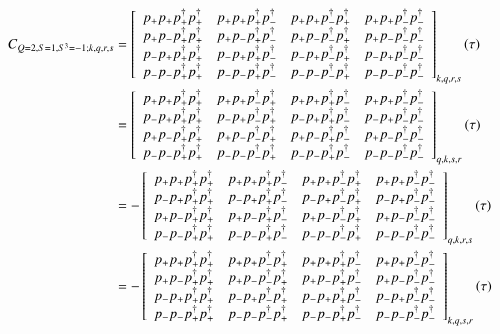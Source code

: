 \begin{equation*}
  \begin{aligned} 
    C_{Q=2,S=1,S^3=-1;k,q,r,s} &=
    \left[
    \begin{array}{cccc}
      \cor{+}{+}{+}{+} & \cor{+}{+}{+}{-} & \cor{+}{+}{-}{+} & \cor{+}{+}{-}{-} \\
      \cor{+}{-}{+}{+} & \cor{+}{-}{+}{-} & \cor{+}{-}{-}{+} & \cor{+}{-}{-}{-} \\
      \cor{-}{+}{+}{+} & \cor{-}{+}{+}{-} & \cor{-}{+}{-}{+} & \cor{-}{+}{-}{-} \\
      \cor{-}{-}{+}{+} & \cor{-}{-}{+}{-} & \cor{-}{-}{-}{+} & \cor{-}{-}{-}{-} \\
    \end{array}
    \right]_{k,q,r,s} (\tau) \\
    &=\left[ 
    \begin{array}{cccc}
      \cor{+}{+}{+}{+} & \cor{+}{+}{-}{+} & \cor{+}{+}{+}{-} & \cor{+}{+}{-}{-} \\
      \cor{-}{+}{+}{+} & \cor{-}{+}{-}{+} & \cor{-}{+}{+}{-} & \cor{-}{+}{-}{-} \\
      \cor{+}{-}{+}{+} & \cor{+}{-}{-}{+} & \cor{+}{-}{+}{-} & \cor{+}{-}{-}{-} \\
      \cor{-}{-}{+}{+} & \cor{-}{-}{-}{+} & \cor{-}{-}{+}{-} & \cor{-}{-}{-}{-} \\
    \end{array}  
    \right]_{q,k,s,r} (\tau) \\
    &= - \left[
    \begin{array}{cccc}
      \cor{+}{+}{+}{+} & \cor{+}{+}{+}{-} & \cor{+}{+}{-}{+} & \cor{+}{+}{-}{-} \\
      \cor{-}{+}{+}{+} & \cor{-}{+}{+}{-} & \cor{-}{+}{-}{+} & \cor{-}{+}{-}{-} \\
      \cor{+}{-}{+}{+} & \cor{+}{-}{+}{-} & \cor{+}{-}{-}{+} & \cor{+}{-}{-}{-} \\
      \cor{-}{-}{+}{+} & \cor{-}{-}{+}{-} & \cor{-}{-}{-}{+} & \cor{-}{-}{-}{-} \\
    \end{array}
    \right]_{q,k,r,s} (\tau) \\
    &= - \left[
    \begin{array}{cccc}
      \cor{+}{+}{+}{+} & \cor{+}{+}{-}{+} & \cor{+}{+}{+}{-} & \cor{+}{+}{-}{-} \\
      \cor{+}{-}{+}{+} & \cor{+}{-}{-}{+} & \cor{+}{-}{+}{-} & \cor{+}{-}{-}{-} \\
      \cor{-}{+}{+}{+} & \cor{-}{+}{-}{+} & \cor{-}{+}{+}{-} & \cor{-}{+}{-}{-} \\
      \cor{-}{-}{+}{+} & \cor{-}{-}{-}{+} & \cor{-}{-}{+}{-} & \cor{-}{-}{-}{-} \\
    \end{array}
    \right]_{k,q,s,r} (\tau) \\
  \end{aligned}
\end{equation*}

